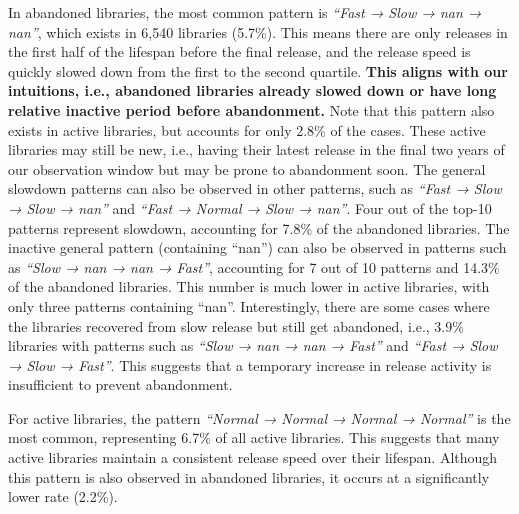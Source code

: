 In abandoned libraries, the most common pattern is \textit{``Fast → Slow → nan → nan''}, which exists in 6,540 libraries (5.7\%). This means there are only releases in the first half of the lifespan before the final release, and the release speed is quickly slowed down from the first to the second quartile. \textbf{This aligns with our intuitions, i.e., abandoned libraries already slowed down or have long relative inactive period before abandonment.} Note that this pattern also exists in active libraries, but accounts for only 2.8\% of the cases. These active libraries may still be new, i.e., having their latest release in the final two years of our observation window but may be prone to abandonment soon. The general slowdown patterns can also be observed in other patterns, such as \textit{``Fast → Slow → Slow → nan''} and \textit{``Fast → Normal → Slow → nan''}. Four out of the top-10 patterns represent slowdown, accounting for 7.8\% of the abandoned libraries. The inactive general pattern (containing ``nan'') can also be observed in patterns such as \textit{``Slow → nan → nan → Fast''}, accounting for 7 out of 10 patterns and 14.3\% of the abandoned libraries. This number is much lower in active libraries, with only three patterns containing ``nan''. Interestingly, there are some cases where the libraries recovered from slow release but still get abandoned, i.e., 3.9\% libraries with patterns such as \textit{``Slow → nan → nan → Fast''} and \textit{``Fast → Slow → Slow → Fast''}. This suggests that a temporary increase in release activity is insufficient to prevent abandonment. 

For active libraries, the pattern \textit{``Normal → Normal → Normal → Normal''} is the most common, representing 6.7\% of all active libraries. This suggests that many active libraries maintain a consistent release speed over their lifespan. Although this pattern is also observed in abandoned libraries, it occurs at a significantly lower rate (2.2\%).


